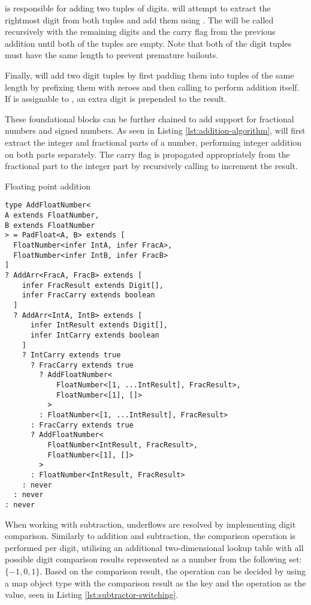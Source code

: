  is responsible for adding two tuples of digits.  will attempt to extract the rightmost digit from both tuples and add them using . The  will be called recursively with the remaining digits and the carry flag from the previous addition until both of the tuples are empty. Note that both of the digit tuples must have the same length to prevent premature bailouts.

Finally,  will add two digit tuples by first padding them into tuples of the same length by prefixing them with zeroes and then calling  to perform addition itself. If  is assignable to , an extra  digit is prepended to the result.

These foundational blocks can be further chained to add support for fractional numbers and signed numbers. As seen in Listing \ref{lst:addition-algorithm},  will first extract the integer and fractional parts of a number, performing integer addition on both parts separately. The carry flag is propagated appropriately from the fractional part to the integer part by recursively calling  to increment the result.

\begin{listing}[ht!]
  \caption{Floating point addition}\label{lst:addition-float}
  \begin{verbatim}
type AddFloatNumber<
A extends FloatNumber,
B extends FloatNumber
> = PadFloat<A, B> extends [
  FloatNumber<infer IntA, infer FracA>,
  FloatNumber<infer IntB, infer FracB>
]
? AddArr<FracA, FracB> extends [
    infer FracResult extends Digit[],
    infer FracCarry extends boolean
  ]
  ? AddArr<IntA, IntB> extends [
      infer IntResult extends Digit[],
      infer IntCarry extends boolean
    ]
    ? IntCarry extends true
      ? FracCarry extends true
        ? AddFloatNumber<
            FloatNumber<[1, ...IntResult], FracResult>,
            FloatNumber<[1], []>
          >
        : FloatNumber<[1, ...IntResult], FracResult>
      : FracCarry extends true
      ? AddFloatNumber<
          FloatNumber<IntResult, FracResult>,
          FloatNumber<[1], []>
        >
      : FloatNumber<IntResult, FracResult>
    : never
  : never
: never
\end{verbatim}
\end{listing}

When working with subtraction, underflows are resolved by implementing digit comparison. Similarly to addition and subtraction, the comparison operation is performed per digit, utilising an additional two-dimensional lookup table with all possible digit comparison results represented as a number from the following set: $\{ -1, 0, 1 \}$. Based on the comparison result, the operation can be decided by using a map object type with the comparison result as the key and the operation as the value, seen in Listing \ref{lst:subtractor-switching}.

